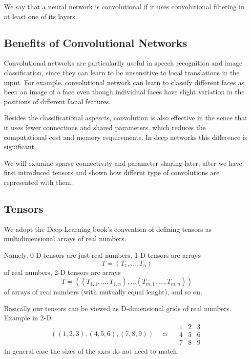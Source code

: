 \documentclass[]{article}
\begin{document}
We say that a neural network is convolutional if it uses convolutional filtering
in at least one of its layers.

\subsection{Benefits of Convolutional Networks}
Convolutional networks are particularlly useful in speech recognition and image
classification, since they can learn to be unsensitive to local translations in the
input. For example, convolutional network can learn to classify different faces as
been an image of a face even though individual faces have slight variation in
the positions of different facial features.

Besides the classificational aspescts, convolution is also effective in the sence
that it uses fewer connections and shared parameters, which reduces the
computational cost and memory requirements. In deep networks this difference is
significant.

We will examine sparse connectivity and parameter sharing later, after we
have first introduced tensors and shown how differnt type of convolutions are
represented with them.

\subsection{Tensors}
We adopt the Deep Learning book's convention of defining tensors as
multidimensional arrays of real numbers.

Namely, 0-D tensors are just real numbers, 1-D tensors are arrays
\[
T = (T_1, \ldots, T_n)
\]
of real numbers, 2-D tensors are arrays
\[
T = ((T_{1,1}, \ldots, T_{1,n}), \ldots (T_{m,1}, \ldots, T_{m,n}))
\]
of arrays of real numbers (with mutually equal lenght), and so on.

Basically our tensors can be viewed as D-dimensional grids of real numbers.
Example in 2-D:
\[
((1, 2, 3), (4, 5, 6), (7, 8, 9)) \quad \simeq \quad
\begin{array}{c|c|c}
  1 & 2 & 3 \\
  \hline
  4 & 5 & 6 \\
  \hline
  7 & 8 & 9
 \end{array}
\]
In general case the sizes of the axes do not need to match.

\end{document}
